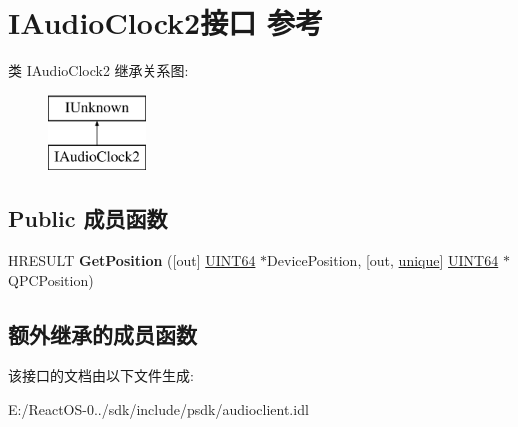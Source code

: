 \hypertarget{interface_i_audio_clock2}{}\section{I\+Audio\+Clock2接口 参考}
\label{interface_i_audio_clock2}
类 I\+Audio\+Clock2 继承关系图\+:\begin{figure}[H]
\begin{center}
\leavevmode
\includegraphics[height=2.000000cm]{interface_i_audio_clock2}
\end{center}
\end{figure}
\subsection*{Public 成员函数}
\begin{DoxyCompactItemize}
\item 
\mbox{\label{interface_i_audio_clock2_aa7fd80250c4139a22da6cbcbbc5bfbca}} 
H\+R\+E\+S\+U\+LT {\bfseries Get\+Position} (\mbox{[}out\mbox{]} \hyperlink{_processor_bind_8h_a57be03562867144161c1bfee95ca8f7c}{U\+I\+N\+T64} $\ast$Device\+Position, \mbox{[}out, \hyperlink{interfaceunique}{unique}\mbox{]} \hyperlink{_processor_bind_8h_a57be03562867144161c1bfee95ca8f7c}{U\+I\+N\+T64} $\ast$Q\+P\+C\+Position)
\end{DoxyCompactItemize}
\subsection*{额外继承的成员函数}


该接口的文档由以下文件生成\+:\begin{DoxyCompactItemize}
\item 
E\+:/\+React\+O\+S-\/0../sdk/include/psdk/audioclient.\+idl\end{DoxyCompactItemize}
